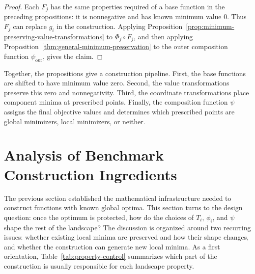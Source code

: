 \documentclass[11pt,a4paper]{article}
\theoremstyle{remark}
\theoremstyle{plain}
\begin{document}
\begin{proof}
	Each \(F_j\) has the same properties required of a base function in the
	preceding propositions: it is nonnegative and has known minimum value \(0\).
	Thus \(F_j\) can replace \(g_i\) in the construction. Applying
	Proposition~\ref{prop:minimum-preserving-value-transformations} to
	\(\Phi_j\circ F_j\), and then applying
	Proposition~\ref{thm:general-minimum-preservation} to the outer composition
	function \(\psi_{\mathrm{out}}\), gives the claim.
\end{proof}


Together, the propositions give a construction pipeline. First, the base
functions are shifted to have minimum value zero. Second, the value
transformations preserve this zero and nonnegativity. Third, the coordinate
transformations place component minima at prescribed points. Finally, the
composition function \(\psi\) assigns the final objective values and determines
which prescribed points are global minimizers, local minimizers, or neither.



\section{Analysis of Benchmark Construction Ingredients}

The previous section established the mathematical infrastructure needed to
construct functions with known global optima. This section turns to the design
question: once the optimum is protected, how do the choices of \(T_i\),
\(\phi_i\), and \(\psi\) shape the rest of the landscape? The discussion is
organized around two recurring issues: whether existing local minima are
preserved and how their shape changes, and whether the construction can generate
new local minima. As a first orientation, Table~\ref{tab:property-control}
summarizes which part of the construction is usually responsible for each
landscape property.
\end{document}
